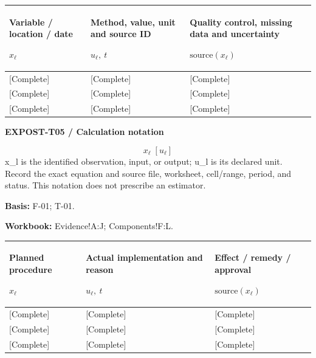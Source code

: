 {\sffamily\fontsize{8.3}{10.3}\selectfont\begin{longtable}{@{}P{54.83mm} P{54.83mm} P{54.83mm}@{}}
\toprule
\textbf{Variable / location / date}\par {\normalfont\fontsize{8.2}{10}\selectfont $x_{\ell}$} & \textbf{Method, value, unit and source ID}\par {\normalfont\fontsize{8.2}{10}\selectfont $u_{\ell},\ t$} & \textbf{Quality control, missing data and uncertainty}\par {\normalfont\fontsize{8.2}{10}\selectfont $\text{source}(x_{\ell})$}\\\midrule\endhead
\rule{0pt}{8mm}[Complete] & [Complete] & [Complete]\\\hline
\rule{0pt}{8mm}[Complete] & [Complete] & [Complete]\\\hline
\rule{0pt}{8mm}[Complete] & [Complete] & [Complete]\\\hline
\end{longtable}}
\par\begingroup\sffamily\fontsize{8}{10}\selectfont\color{NEBGreen}\setlength{\parskip}{2pt}\setlength{\abovedisplayskip}{4pt}\setlength{\belowdisplayskip}{4pt}\setlength{\abovedisplayshortskip}{2pt}\setlength{\belowdisplayshortskip}{3pt}
\textbf{EXPOST-T05 / Calculation notation}\par
{\fontsize{9}{11}\selectfont\[ x_{\ell}\;[u_{\ell}] \]}
x\_l is the identified observation, input, or output; u\_l is its declared unit. Record the exact equation and source file, worksheet, cell/range, period, and status. This notation does not prescribe an estimator.\par
\textbf{Basis:} F-01; T-01.\par
\textbf{Workbook:} Evidence!A:J; Components!F:L.\par\endgroup
{\sffamily\fontsize{8.3}{10.3}\selectfont\begin{longtable}{@{}P{54.83mm} P{54.83mm} P{54.83mm}@{}}
\toprule
\textbf{Planned procedure}\par {\normalfont\fontsize{8.2}{10}\selectfont $x_{\ell}$} & \textbf{Actual implementation and reason}\par {\normalfont\fontsize{8.2}{10}\selectfont $u_{\ell},\ t$} & \textbf{Effect / remedy / approval}\par {\normalfont\fontsize{8.2}{10}\selectfont $\text{source}(x_{\ell})$}\\\midrule\endhead
\rule{0pt}{8mm}[Complete] & [Complete] & [Complete]\\\hline
\rule{0pt}{8mm}[Complete] & [Complete] & [Complete]\\\hline
\rule{0pt}{8mm}[Complete] & [Complete] & [Complete]\\\hline
\end{longtable}}
